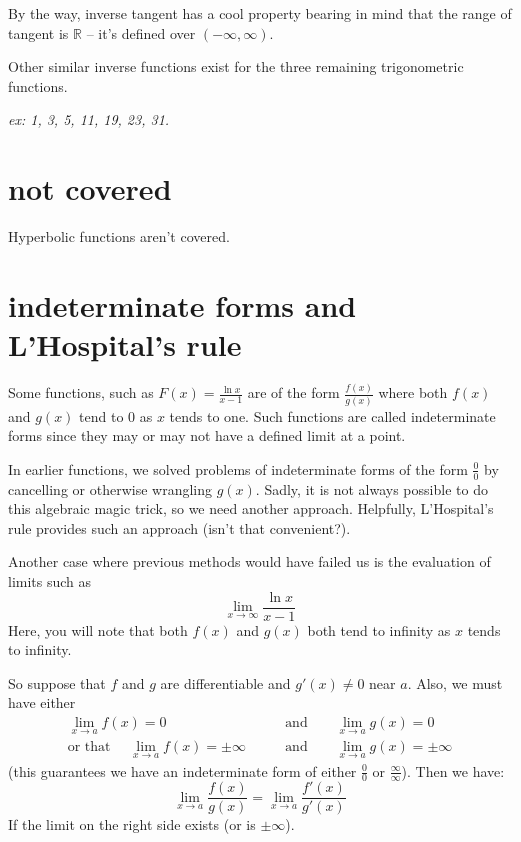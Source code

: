 \documentclass[10pt,a4paper]{report}
\begin{document}
By the way, inverse tangent has a cool property bearing in mind that the range of tangent is $\mathbb{R}$ -- it's defined over $(-\infty, \infty)$.

Other similar inverse functions exist for the three remaining trigonometric functions.

\emph{ex: 1, 3, 5, 11, 19, 23, 31.}

\section{not covered}

Hyperbolic functions aren't covered.

\section{indeterminate forms and L'Hospital's rule}

Some functions, such as $F(x) = \frac{\ln x}{x - 1}$ are of the form $\frac{f(x)}{g(x)}$ where both $f(x)$ and $g(x)$ tend to 0 as $x$ tends to one. Such functions are called indeterminate forms since they may or may not have a defined limit at a point.

In earlier functions, we solved problems of indeterminate forms of the form $\frac{0}{0}$ by cancelling or otherwise wrangling $g(x)$. Sadly, it is not always possible to do this algebraic magic trick, so we need another approach. Helpfully, L'Hospital's rule provides such an approach (isn't that convenient?).

Another case where previous methods would have failed us is the evaluation of limits such as
$$
	\lim_{x \to \infty} \frac{\ln x}{x - 1}
$$
Here, you will note that both $f(x)$ and $g(x)$ both tend to infinity as $x$ tends to infinity.

So suppose that $f$ and $g$ are differentiable and $g'(x) \ne 0$ near $a$. Also, we must have either
\begin{align*}
	\lim_{x \to a} f(x) = 0 \qquad & \text{and} \qquad \lim_{x \to a} g(x) = 0 \\
	\text{or that } \quad \lim_{x \to a} f(x) = \pm \infty \qquad & \text{and} \qquad \lim_{x \to a} g(x) = \pm \infty 
\end{align*}
(this guarantees we have an indeterminate form of either $\frac{0}{0}$ or $\frac{\infty}{\infty}$). Then we have:
$$
	\lim_{x \to a} \frac{f(x)}{g(x)} = \lim_{x \to a} \frac{f'(x)}{g'(x)}
$$
If the limit on the right side exists (or is $\pm \infty$).
\end{document}
